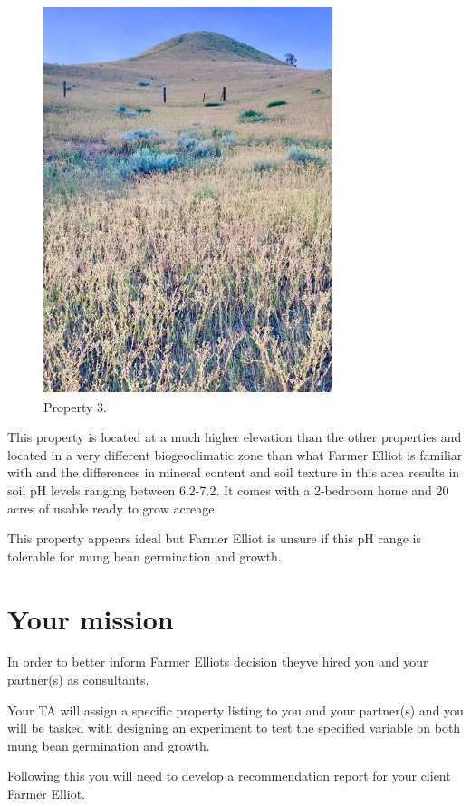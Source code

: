 \documentclass[
]{book}
\begin{document}
\begin{figure}
\centering
\includegraphics{images/prop-3.png}
\caption{Property 3.}
\end{figure}

This property is located at a much higher elevation than the other properties and located in a very different biogeoclimatic zone than what Farmer Elliot is familiar with and the differences in mineral content and soil texture in this area results in soil pH levels ranging between 6.2-7.2. It comes with a 2-bedroom home and 20 acres of usable ready to grow acreage.

This property appears ideal but Farmer Elliot is unsure if this pH range is tolerable for mung bean germination and growth.

\hypertarget{your-mission}{%
\section*{Your mission}\label{your-mission}}

In order to better inform Farmer Elliot\textquotesingle s decision they\textquotesingle ve hired you and your partner(s) as consultants.

Your TA will assign a specific property listing to you and your partner(s) and you will be tasked with designing an experiment to test the specified variable on both mung bean germination and growth.

Following this you will need to develop a recommendation report for your client Farmer Elliot.
\end{document}
